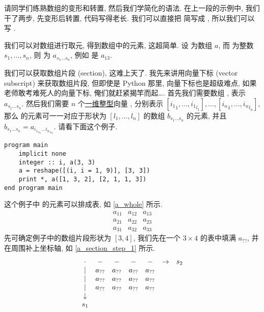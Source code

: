 请同学们练熟数组的变形和转置, 然后我们学简化的语法. 在上一段的示例中, 我们干了两步, 先变形后转置, 代码写得老长. 我们可以直接把  简写成 , 所以我们可以写 .

我们可以对数组进行取元, 得到数组中的元素, 这超简单. 设  为数组 $a$, 而  为整数 $s_1, \dots, s_n$, 则  为 $a_{s_1\dots s_n}$, 例如  是 $a_{13}$.

我们可以获取数组片段 (section), 这难上天了. 我先来讲用向量下标 (vector subscript) 来获取数组片段, 但即使是 Python 那里, 向量下标也是超级难点, 如果老师敢考难死人的向量下标, 俺们就赶紧揭竿而起\dots{}. 首先我们需要数组 , 表示 $a_{s_1\dots s_n}$. 然后我们需要 $n$ 个\uline{一维整型}向量 , 分别表示 $[{i_1}_1, \dots, {i_1}_{l_1}], \dots, [{i_n}_1, \dots, {i_n}_{l_n}]$, 那么  的元素可一一对应于形状为 $[l_1, \dots, l_n]$ 的数组 $b_{s_1\dots s_n}$ 的元素, 并且 $b_{ s_1\dots s_n }=a_{ {i_1}_{s_1}\dots {i_n}_{s_n} }$. 请看下面这个例子.
\begin{lstlisting}
program main
    implicit none
    integer :: i, a(3, 3)
    a = reshape([(i, i = 1, 9)], [3, 3])
    print *, a([1, 3, 2], [2, 1, 1, 3])
end program main
\end{lstlisting}
这个例子中  的元素可以排成表, 如 \eqref{a_whole} 所示.
\begin{equation}
    \begin{matrix}
        a_{11}&a_{12}&a_{13}\\
        a_{21}&a_{22}&a_{23}\\
        a_{31}&a_{32}&a_{33}
    \end{matrix}\label{a_whole}
\end{equation}
先可确定例子中的数组片段形状为 $[3, 4]$, 我们先在一个 $3\times4$ 的表中填满 $a_{??}$, 并在周围补上坐标轴, 如 \eqref{a_section_step_1} 所示.
\begin{equation}
    \begin{matrix}
        \cdot&-&-&-&-&\rightarrow&s_2\\
        |&a_{??}&a_{??}&a_{??}&a_{??}&\\
        |&a_{??}&a_{??}&a_{??}&a_{??}&\\
        |&a_{??}&a_{??}&a_{??}&a_{??}&\\
        \downarrow&&&&&&\\
        s_1&&&&&&
    \end{matrix}\label{a_section_step_1}
\end{equation}
